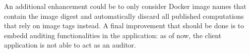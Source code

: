 An additional enhancement could be to only consider Docker image names that contain the image digest and automatically discard all published computations that rely on image tags instead.
A final improvement that should be done is to embedd auditing functionalities in the application: as of now, the client application is not able to act as an auditor.
